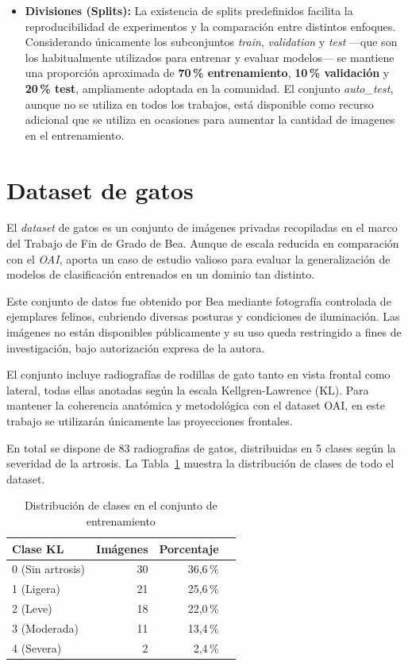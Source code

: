 \documentclass[11pt,spanish,listoffigures,listoftables]{tfgetsinf}
\begin{document}
\begin{itemize}
    \item \textbf{Divisiones (Splits):} La existencia de splits predefinidos facilita la reproducibilidad de experimentos y la comparación entre distintos enfoques. 
    Considerando únicamente los subconjuntos \textit{train}, \textit{validation} y \textit{test} —que son los habitualmente utilizados para entrenar y evaluar modelos— 
    se mantiene una proporción aproximada de \textbf{70\,\% entrenamiento}, \textbf{10\,\% validación} y \textbf{20\,\% test}, ampliamente adoptada en la comunidad. 
    El conjunto \textit{auto\_test}, aunque no se utiliza en todos los trabajos, está disponible como recurso adicional que se utiliza en ocasiones para aumentar la cantidad de 
    imagenes en el entrenamiento.
\end{itemize}

\section{Dataset de gatos}
\label{sec:3_3_dataset_gatos}

El \emph{dataset} de gatos es un conjunto de imágenes privadas recopiladas en el marco del Trabajo de Fin de Grado de Bea. 
Aunque de escala reducida en comparación con el \emph{OAI}, aporta un caso de estudio valioso para evaluar la generalización 
de modelos de clasificación entrenados en un dominio tan distinto.

Este conjunto de datos fue obtenido por Bea mediante fotografía controlada de ejemplares felinos, cubriendo diversas 
posturas y condiciones de iluminación. Las imágenes no están disponibles públicamente y su uso queda restringido a fines 
de investigación, bajo autorización expresa de la autora.

El conjunto incluye radiografías de rodillas de gato tanto en vista frontal como lateral, todas ellas anotadas según la 
escala Kellgren-Lawrence (KL). Para mantener la coherencia anatómica y metodológica con el dataset OAI, en este trabajo 
se utilizarán únicamente las proyecciones frontales.

En total se dispone de 83 radiografias de gatos, distribuidas en 5 clases según la severidad de la artrosis. La 
Tabla~\ref{tab:cat_class_distribution} muestra la distribución de clases de todo el dataset.

\begin{table}[h]
    \centering
    \caption{Distribución de clases en el conjunto de entrenamiento}
    \label{tab:cat_class_distribution}
    \begin{tabular}{lrrr}
        \toprule
        \textbf{Clase KL}  & \textbf{Imágenes} & \textbf{Porcentaje} \\
        \midrule
        0 (Sin artrosis)  & 30 & 36,6\,\% \\
        1 (Ligera)        & 21 & 25,6\,\% \\
        2 (Leve)          & 18 & 22,0\,\% \\
        3 (Moderada)      & 11 & 13,4\,\% \\
        4 (Severa)        &  2 &  2,4\,\% \\
        \bottomrule
    \end{tabular}
\end{table}
\end{document}
